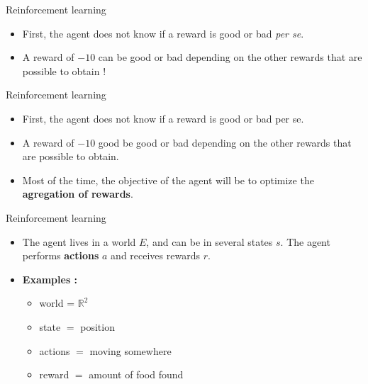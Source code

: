 \documentclass[usenames,dvipsnames,french]{beamer}
\begin{document}
\begin{frame}{Reinforcement learning}
   \begin{itemize}
	\item First, the agent does not know if a reward is good or bad \textit{per se}.
	\item A reward of $-10$ can be good or bad depending on the other rewards
        that are possible to obtain !
   \end{itemize} 
\end{frame}

\begin{frame}{Reinforcement learning}
   \begin{itemize}
	\item First, the agent does not know if a reward is good or bad per se.
	\item A reward of $-10$ good be good or bad depending on the other rewards that are possible to obtain.
	\item Most of the time, the objective of the agent will be to optimize the \textbf{{agregation of rewards}}.
   \end{itemize} 
\end{frame}

\begin{frame}{Reinforcement learning}
   \begin{itemize}
       \item The agent lives in a world $E$, and can be in several states $s$. The agent performs \textbf{{actions}} $a$ and receives rewards $r$.
	   \item \textbf{{Examples : }} \begin{itemize}
		   \item world = $ \mathbb{R}^2$ 
	       \item state $=$ position
		\item actions $=$ moving somewhere
		\item reward $=$ amount of food found
	   \end{itemize}
   \end{itemize} 
\end{frame}
\end{document}
